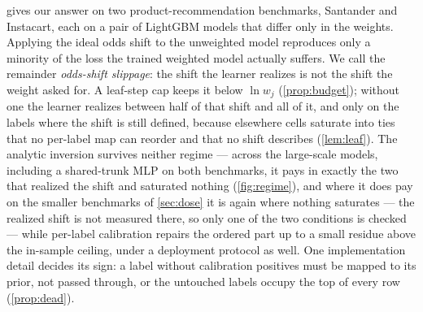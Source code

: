 \documentclass[sigconf,nonacm]{acmart}
\begin{document}
 gives our answer on two product-recommendation benchmarks, Santander and Instacart, each on a pair of LightGBM models that differ only in the weights. Applying the ideal odds shift to the unweighted model reproduces only a minority of the loss the trained weighted model actually suffers. We call the remainder \emph{odds-shift slippage}: the shift the learner realizes is not the shift the weight asked for. A leaf-step cap keeps it below $\ln w_j$ (\cref{prop:budget}); without one the learner realizes between half of that shift and all of it, and only on the labels where the shift is still defined, because elsewhere cells saturate into ties that no per-label map can reorder and that no shift describes (\cref{lem:leaf}). The analytic inversion survives neither regime --- across the large-scale models, including a shared-trunk MLP on both benchmarks, it pays in exactly the two that realized the shift and saturated nothing (\cref{fig:regime}), and where it does pay on the smaller benchmarks of \cref{sec:dose} it is again where nothing saturates --- the realized shift is not measured there, so only one of the two conditions is checked --- while per-label calibration repairs the ordered part up to a small residue above the in-sample ceiling, under a deployment protocol as well. One implementation detail decides its sign: a label without calibration positives must be mapped to its prior, not passed through, or the untouched labels occupy the top of every row (\cref{prop:dead}).
\end{document}

